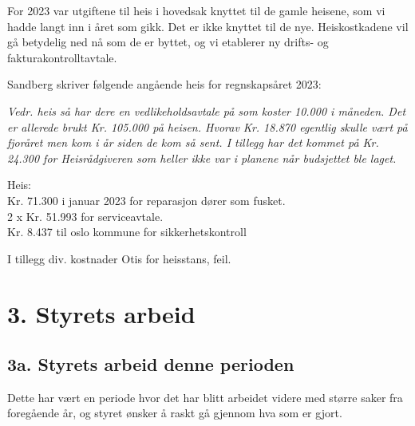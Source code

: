 \documentclass[12pt]{article}
\begin{document}
For 2023 var utgiftene til heis i hovedsak knyttet til de gamle heisene, som vi hadde langt inn i
året som gikk. Det er ikke knyttet til de nye. Heiskostkadene vil gå betydelig ned nå som de er
byttet, og vi etablerer ny drifts- og fakturakontrolltavtale.

Sandberg skriver følgende angående heis for regnskapsåret 2023:

{\it Vedr. heis så har dere en vedlikeholdsavtale på som koster 10.000 i måneden. Det er allerede brukt Kr. 105.000 på heisen. Hvorav Kr. 18.870 egentlig skulle vært på fjoråret men kom i år siden de kom så sent. I tillegg har det kommet på Kr. 24.300 for Heisrådgiveren som heller ikke var i planene når budsjettet ble laget.

Heis:\\
Kr. 71.300 i januar 2023 for reparasjon dører som fusket.\\
2 x Kr. 51.993 for serviceavtale.\\
Kr. 8.437 til oslo kommune for sikkerhetskontroll

I tillegg div. kostnader Otis for heisstans, feil.}


\section*{3. Styrets arbeid}

\subsection*{3a. Styrets arbeid denne perioden}

Dette har vært en periode hvor det har blitt arbeidet videre med større saker fra foregående år, og styret ønsker å raskt gå gjennom hva som er gjort.
\end{document}
